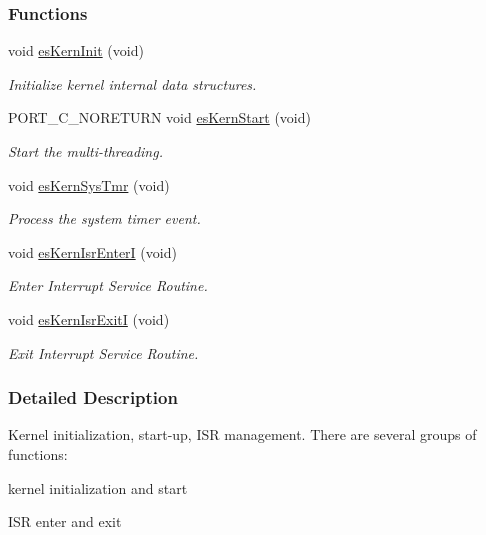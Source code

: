 \subsubsection*{Functions}
\begin{DoxyCompactItemize}
\item 
void \hyperlink{group__kern__general_ga9e9ff699d62d6035cd51121bb3140704}{es\-Kern\-Init} (void)
\begin{DoxyCompactList}\small\item\em Initialize kernel internal data structures. \end{DoxyCompactList}\item 
P\-O\-R\-T\-\_\-\-C\-\_\-\-N\-O\-R\-E\-T\-U\-R\-N void \hyperlink{group__kern__general_ga0e7a0a6b9c02df58de0f98de0229a09d}{es\-Kern\-Start} (void)
\begin{DoxyCompactList}\small\item\em Start the multi-\/threading. \end{DoxyCompactList}\item 
void \hyperlink{group__kern__general_ga3182e4c1a47897109d0a429b10a2483e}{es\-Kern\-Sys\-Tmr} (void)
\begin{DoxyCompactList}\small\item\em Process the system timer event. \end{DoxyCompactList}\item 
void \hyperlink{group__kern__general_gac0d578bcd4a10b2c8e5fc90f0b86ccec}{es\-Kern\-Isr\-Enter\-I} (void)
\begin{DoxyCompactList}\small\item\em Enter Interrupt Service Routine. \end{DoxyCompactList}\item 
void \hyperlink{group__kern__general_gaa6347925fff1684b5425dd2857c27129}{es\-Kern\-Isr\-Exit\-I} (void)
\begin{DoxyCompactList}\small\item\em Exit Interrupt Service Routine. \end{DoxyCompactList}\end{DoxyCompactItemize}


\subsubsection{Detailed Description}
Kernel initialization, start-\/up, I\-S\-R management. There are several groups of functions\-:
\begin{DoxyItemize}
\item kernel initialization and start
\item I\-S\-R enter and exit 
\end{DoxyItemize}

